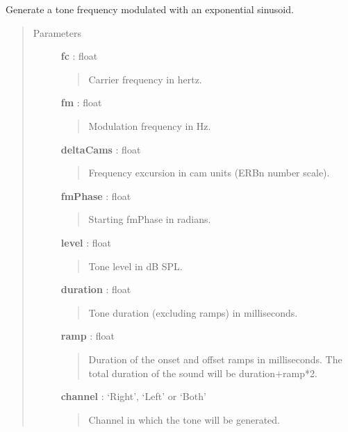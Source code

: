 \documentclass[a4paper,12pt,english]{sphinxmanual}
\begin{document}
\begin{fulllineitems}
\label{sndlib:sndlib.camSinFMTone}
Generate a tone frequency modulated with an exponential sinusoid.
\begin{quote}\begin{description}
\item[{Parameters }] \leavevmode
\textbf{fc} : float
\begin{quote}

Carrier frequency in hertz.
\end{quote}

\textbf{fm} : float
\begin{quote}

Modulation frequency in Hz.
\end{quote}

\textbf{deltaCams} : float
\begin{quote}

Frequency excursion in cam units (ERBn number scale).
\end{quote}

\textbf{fmPhase} : float
\begin{quote}

Starting fmPhase in radians.
\end{quote}

\textbf{level} : float
\begin{quote}

Tone level in dB SPL.
\end{quote}

\textbf{duration} : float
\begin{quote}

Tone duration (excluding ramps) in milliseconds.
\end{quote}

\textbf{ramp} : float
\begin{quote}

Duration of the onset and offset ramps in milliseconds.
The total duration of the sound will be duration+ramp*2.
\end{quote}

\textbf{channel} : `Right', `Left' or `Both'
\begin{quote}

Channel in which the tone will be generated.
\end{quote}


\end{description}
\end{quote}
\end{fulllineitems}
\end{document}
